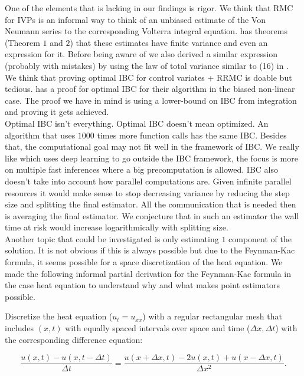 \documentclass[a4paper,12pt]{article}
\begin{document}
One of the elements that is lacking in our findings is rigor.  We think
that RMC for IVPs is an informal way to think of an unbiased estimate of
the Von Neumann series to the corresponding Volterra integral equation.
\cite{ermakov_monte_2019} has theorems (Theorem $1$ and $2$) that these
estimates have finite variance and even an expression for it.
Before being aware of \cite{ermakov_monte_2019} we
also derived a similar expression (probably with mistakes)
by using the law of total variance similar to (16) in \cite{rath_ears_2022}.\\
We think that proving optimal IBC for control variates + RRMC is doable
but tedious. \cite{daun_randomized_2011} has a proof for optimal IBC for their algorithm
in the biased non-linear case. The proof we have in mind is using a lower-bound on IBC
from integration and proving it gets achieved.\\

Optimal IBC isn't everything. Optimal IBC doesn't mean optimized. An algorithm that
uses $1000$ times more function calls has the same IBC. Besides that, the computational goal
may not fit well in the framework of IBC. We really like
\cite{becker_learning_2022} which uses deep learning to go outside
the IBC framework, the focus is more on multiple fast inferences where
a big precomputation is allowed.
IBC also doesn't take into account how
parallel computations are. Given infinite parallel resources it would make sense
to stop decreasing variance by reducing the step size and splitting the final estimator.
All the communication that is needed then is averaging the final estimator. We conjecture
that in such an estimator the wall time at risk would increase logarithmically with splitting
size.  \\

Another topic that could be investigated is only estimating $1$ component of the solution.
It is not obvious if this is always possible but due to the Feynman-Kac formula,
it seems possible for a space discretization of the heat equation.
We made the following informal partial derivation for the Feynman-Kac formula
in the case heat equation
to understand why and what makes point estimators possible.

Discretize the heat equation ($u_{t} = u_{xx}$)
with a regular rectangular mesh that includes $(x,t)$ with equally
spaced intervals over space and time ($\Delta x, \Delta t$) with
the corresponding difference equation:

\begin{equation}
    \frac{u(x,t)-u(x,t-\Delta t)}{\Delta t} = \frac{u(x + \Delta x,t)-2 u(x,t) +u(x - \Delta x,t)}{\Delta x^{2}} .
\end{equation}
\end{document}
